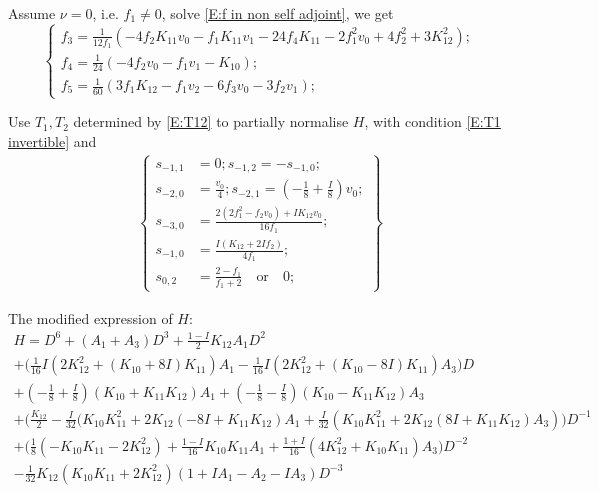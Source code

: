 \documentclass[11pt]{article}
\theoremstyle{definition}
\theoremstyle{plain}
\numberwithin{equation}{section}
\begin{document}
Assume $\nu=0$, i.e. $f_1\neq 0$, solve \eqref{E:f in non self adjoint}, we get
$$
\begin{cases}
	f_3=\frac{1}{12 f_1}(-4 f_2 K_{11} v_0-f_1 K_{11} v_1-24 f_4 K_{11}-2 f_1^2 v_0+4 f_2^2+3 K_{12}^2);
	\\f_4=\frac{1}{24} (-4 f_2 v_0-f_1v_1-K_{10});
	\\f_5=\frac{1}{60} (3 f_1 K_{12}-f_1 v_2-6 f_3 v_0-3 f_2 v_1);
\end{cases}
$$

Use $T_1,T_2$ determined by \eqref{E:T12} to partially normalise $H$, with condition \eqref{E:T1 invertible} and 
\begin{align}
	\label{E:Second conjugation nonself v=0}
	\left\{\begin{aligned}
		s_{-1,1}&=0;s_{-1,2}=-s_{-1,0};
		\\s_{-2,0}&=\frac{v_0}{4};s_{-2,1}=(-\frac{1}{8}+\frac{I}{8}) v_0;
		\\s_{-3,0}&=\frac{2 (2 f_1^2-f_2 v_0)+I K_{12} v_0}{16 f_1};
		\\ s_{-1,0}&=\frac{I (K_{12}+2 I f_2)}{4 f_1};
		\\s_{0,2}&=\frac{2-f_1 }{f_1+2}\quad \text{or} \quad 0;
		\end{aligned}\right\}
\end{align}

The modified  expression of $H$:
\begin{multline*}
H=D^6+(A_1+A_3)D^3+\frac{1-I}{2}K_{12}A_1D^2
\\+\Big(\frac{1}{16} I (2 K_{12}^2+(K_{10}+8 I) K_{11})A_1-\frac{1}{16} I (2 K_{12}^2+(K_{10}-8 I) K_{11})A_3 \Big)D
\\+(-\frac{1}{8}+\frac{I}{8}) (K_{10}+K_{11}K_{12})A_1+(-\frac{1}{8}-\frac{I}{8}) (K_{10}-K_{11}K_{12})A_3
\\+\Big(\frac{K_{12}}{2}-\frac{I}{32}(K_{10} K_{11}^2 + 2 K_{12} (-8 I + K_{11} K_{12})A_1+\frac{I}{32}(K_{10} K_{11}^2 + 2 K_{12} (8 I + K_{11} K_{12})A_3)\Big)D^{-1}
\\+\Big(\frac{1}{8} (-K_{10} K_{11} - 2 K_{12}^2)+\frac{1-I}{16}K_{10}K_{11}A_1+\frac{1+I}{16}(4K_{12}^2+K_{10}K_{11})A_3\Big)D^{-2}
\\-\frac{1}{32}K_{12} (K_{10} K_{11} + 2 K_{12}^2)(1+IA_1-A_2-IA_3)D^{-3} 
\end{multline*}
\end{document}
